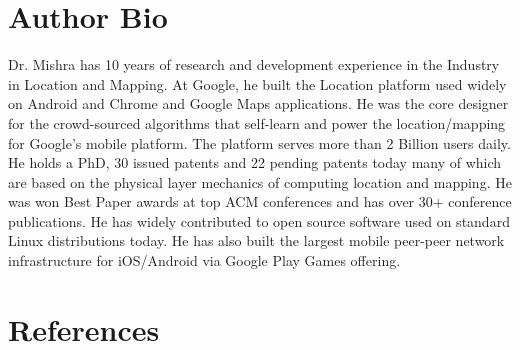 \documentclass[preprint,10pt]{elsarticle}
\theoremstyle{definition}
\begin{document}



%

\section{Author Bio}

 Dr. Mishra has 10 years of research and development experience in the Industry in
Location and Mapping. At Google, he built the Location platform used widely on Android and Chrome and Google Maps
applications. He was the core designer for the crowd-sourced algorithms that self-learn and power the location/mapping
for Google's mobile platform. The platform serves more than 2 Billion users daily. He holds a PhD, 30 issued patents and
22 pending patents today many of which are based on the physical layer mechanics of computing location and mapping. He
was won Best Paper awards at top ACM conferences and has over 30+ conference publications. He has widely contributed to
open source software used on standard Linux distributions today. He has also built the largest mobile peer-peer network
infrastructure for iOS/Android via Google Play Games offering.

\section{References}

\end{document}

